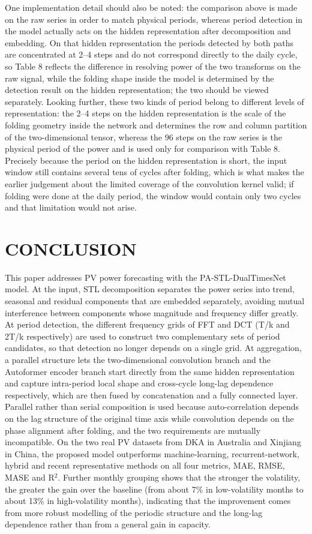\documentclass{iopjournal}
\begin{document}
One implementation detail should also be noted: the comparison above is made on the raw series in order to match physical periods, whereas period detection in the model actually acts on the hidden representation after decomposition and embedding. On that hidden representation the periods detected by both paths are concentrated at 2--4 steps and do not correspond directly to the daily cycle, so Table 8 reflects the difference in resolving power of the two transforms on the raw signal, while the folding shape inside the model is determined by the detection result on the hidden representation; the two should be viewed separately. Looking further, these two kinds of period belong to different levels of representation: the 2--4 steps on the hidden representation is the scale of the folding geometry inside the network and determines the row and column partition of the two-dimensional tensor, whereas the 96 steps on the raw series is the physical period of the power and is used only for comparison with Table 8. Precisely because the period on the hidden representation is short, the input window still contains several tens of cycles after folding, which is what makes the earlier judgement about the limited coverage of the convolution kernel valid; if folding were done at the daily period, the window would contain only two cycles and that limitation would not arise.

\section{CONCLUSION}

This paper addresses PV power forecasting with the PA-STL-DualTimesNet model. At the input, STL decomposition separates the power series into trend, seasonal and residual components that are embedded separately, avoiding mutual interference between components whose magnitude and frequency differ greatly. At period detection, the different frequency grids of FFT and DCT (T/k and 2T/k respectively) are used to construct two complementary sets of period candidates, so that detection no longer depends on a single grid. At aggregation, a parallel structure lets the two-dimensional convolution branch and the Autoformer encoder branch start directly from the same hidden representation and capture intra-period local shape and cross-cycle long-lag dependence respectively, which are then fused by concatenation and a fully connected layer. Parallel rather than serial composition is used because auto-correlation depends on the lag structure of the original time axis while convolution depends on the phase alignment after folding, and the two requirements are mutually incompatible. On the two real PV datasets from DKA in Australia and Xinjiang in China, the proposed model outperforms machine-learning, recurrent-network, hybrid and recent representative methods on all four metrics, MAE, RMSE, MASE and R$^2$. Further monthly grouping shows that the stronger the volatility, the greater the gain over the baseline (from about 7\% in low-volatility months to about 13\% in high-volatility months), indicating that the improvement comes from more robust modelling of the periodic structure and the long-lag dependence rather than from a general gain in capacity.
\end{document}
